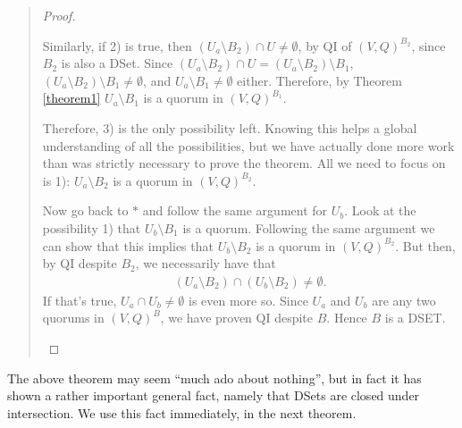 \begin{quote}
\begin{proof}
\begin{case}
\vspace{0.3cm}
Similarly, if 2) is true, then $(U_a \setminus B_2) \cap U \ne \emptyset$, by QI of $(V, Q)^{B_2}$, since $B_2$ is also a DSet. Since $(U_a \setminus B_2) \cap U = (U_a \setminus B_2) \setminus B_1$, $(U_a \setminus B_2) \setminus B_1 \ne \emptyset$, and $U_a \setminus B_1 \ne \emptyset$ either. Therefore, by Theorem \ref{theorem1} $U_a \setminus B_1$ is a quorum in $(V, Q)^{B_1}$.

\vspace{0.3cm}
Therefore, 3) is the only possibility left. Knowing this helps a global understanding of all the possibilities, but we have actually done more work than was strictly necessary to prove the theorem. All we need to focus on is 1): $U_a \setminus B_2$ is a quorum in $(V, Q)^{B_2}$.

\vspace{0.3cm}
Now go back to $*$ and follow the same argument for $U_b$. Look at the possibility 1) that
$U_b \setminus B_1$ is a quorum. Following the same argument we can show that this implies that $U_b \setminus B_2$ is a quorum in $(V, Q)^{B_2}$. But then, by QI despite $B_2$, we necessarily have that
\begin{align}
(U_a \setminus B_2) \cap (U_b \setminus B_2) \ne \emptyset.
\end{align}
If that's true, $U_a \cap U_b \ne \emptyset$ is even more so. Since $U_a$ and $U_b$ are any two quorums in $(V, Q)^B$, we have proven QI despite $B$. Hence $B$ is a DSET.
\end{case}
\vspace{-0.5cm}
\end{proof}
\end{quote}

The above theorem may seem ``much ado about nothing'', but in fact it has shown a rather important general fact, namely that DSets are closed under intersection. We use this fact immediately, in the next theorem.



